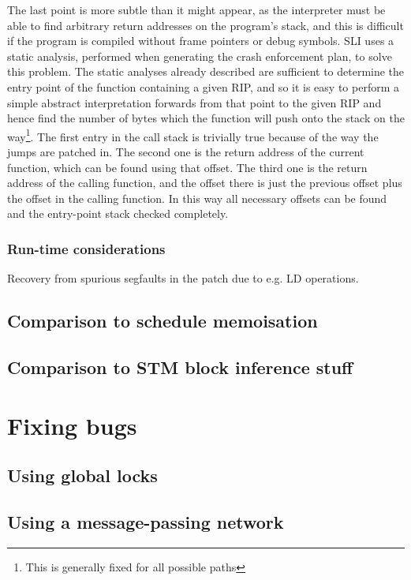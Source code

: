 The last point is more subtle than it might appear, as the interpreter must be able to find arbitrary return addresses on the program's stack, and this is difficult if the program is compiled without frame pointers or debug symbols.
SLI uses a static analysis, performed when generating the crash enforcement plan, to solve this problem.
The static analyses already described are sufficient to determine the entry point of the function containing a given RIP, and so it is easy to perform a simple abstract interpretation forwards from that point to the given RIP and hence find the number of bytes which the function will push onto the stack on the way\footnote{This is generally fixed for all possible paths}.
The first entry in the call stack is trivially true because of the way the jumps are patched in.
The second one is the return address of the current function, which can be found using that offset.
The third one is the return address of the calling function, and the offset there is just the previous offset plus the offset in the calling function.
In this way all necessary offsets can be found and the entry-point stack checked completely.

\subsubsection{Run-time considerations}

Recovery from spurious segfaults in the patch due to e.g. LD operations.

\subsection{Comparison to schedule memoisation}
\subsection{Comparison to STM block inference stuff}

\section{Fixing bugs}

\subsection{Using global locks}
\label{sect:fix_global_lock}


\subsection{Using a message-passing network}

